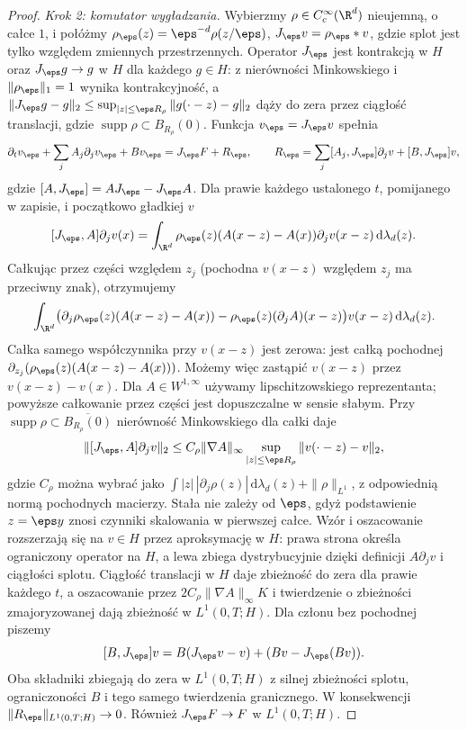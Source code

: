 \begin{proof}
\emph{Krok 2: komutator wygładzania.}
Wybierzmy $\rho\in C_c^\infty(\R^d)$ nieujemną,
o całce $1$, i połóżmy
$\rho_\eps(z)=\eps^{-d}\rho(z/\eps)$,
$J_\eps v=\rho_\eps*v$, gdzie splot jest tylko
względem zmiennych przestrzennych.
Operator $J_\eps$ jest kontrakcją w $H$ oraz
$J_\eps g\to g$ w $H$ dla każdego $g\in H$:
z nierówności Minkowskiego i $\|\rho_\eps\|_1=1$
wynika kontrakcyjność, a
$\|J_\eps g-g\|_2\le
\sup_{|z|\le\eps R_\rho}\|g(\cdot-z)-g\|_2$
dąży do zera przez ciągłość translacji,
gdzie $\operatorname{supp}\rho\subset B_{R_\rho}(0)$.
Funkcja $v_\eps=J_\eps v$ spełnia
\[
 \partial_t v_\eps+\sum_j A_j\partial_j v_\eps+Bv_\eps
 =J_\eps F+R_\eps,\qquad
 R_\eps=\sum_j[A_j,J_\eps]\partial_jv+[B,J_\eps]v,
\]
gdzie $[A,J_\eps]=AJ_\eps-J_\eps A$.
Dla prawie każdego ustalonego $t$, pomijanego
w zapisie, i początkowo gładkiej $v$
\[
 [J_\eps,A]\partial_jv(x)=
 \int_{\R^d}\rho_\eps(z)(A(x-z)-A(x))\partial_jv(x-z)
 \,\mathrm d\lambda_d(z).
\]
Całkując przez części względem $z_j$ (pochodna
$v(x-z)$ względem $z_j$ ma przeciwny znak),
otrzymujemy
\[
 \int_{\R^d}
 \bigl(\partial_j\rho_\eps(z)(A(x-z)-A(x))
 -\rho_\eps(z)(\partial_j A)(x-z)\bigr)v(x-z)
 \,\mathrm d\lambda_d(z).
\]
Całka samego współczynnika przy $v(x-z)$ jest
zerowa: jest całką pochodnej
$\partial_{z_j}(\rho_\eps(z)(A(x-z)-A(x)))$.
Możemy więc zastąpić $v(x-z)$ przez $v(x-z)-v(x)$.
Dla $A\in W^{1,\infty}$ używamy lipschitzowskiego
reprezentanta; powyższe całkowanie przez części
jest dopuszczalne w sensie słabym.
Przy $\operatorname{supp}\rho\subset\overline{B_{R_\rho}(0)}$
nierówność Minkowskiego dla całki daje
\[
 \|[J_\eps,A]\partial_jv\|_2
 \le C_\rho\|\nabla A\|_\infty
       \sup_{|z|\le\eps R_\rho}\|v(\cdot-z)-v\|_2,
\]
gdzie $C_\rho$ można wybrać jako
$\int |z|\,|\partial_j\rho(z)|\,\mathrm d\lambda_d(z)
+\|\rho\|_{L^1}$, z odpowiednią normą pochodnych
macierzy. Stała nie zależy od $\eps$, gdyż podstawienie
$z=\eps y$ znosi czynniki skalowania w pierwszej całce.
Wzór i oszacowanie rozszerzają się na $v\in H$ przez
aproksymację w $H$: prawa strona określa ograniczony
operator na $H$, a lewa zbiega dystrybucyjnie dzięki
definicji $A\partial_j v$ i ciągłości splotu.
Ciągłość translacji w $H$ daje zbieżność do zera
dla prawie każdego $t$, a oszacowanie przez
$2C_\rho\|\nabla A\|_\infty K$ i twierdzenie
o zbieżności zmajoryzowanej dają zbieżność
w $L^1(0,T;H)$. Dla członu bez pochodnej piszemy
\[
 [B,J_\eps]v=B(J_\eps v-v)+(Bv-J_\eps(Bv)).
\]
Oba składniki zbiegają do zera w $L^1(0,T;H)$
z silnej zbieżności splotu, ograniczoności $B$
i tego samego twierdzenia granicznego.
W konsekwencji $\|R_\eps\|_{L^1(0,T;H)}\to0$.
Również $J_\eps F\to F$ w $L^1(0,T;H)$.


\end{proof}
